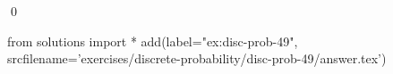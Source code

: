 
\begin{ex} 
  \label{ex:disc-prob-49}
  
  \qed
\end{ex} 
\begin{python0}
from solutions import *
add(label="ex:disc-prob-49",
    srcfilename='exercises/discrete-probability/disc-prob-49/answer.tex') 
\end{python0}
